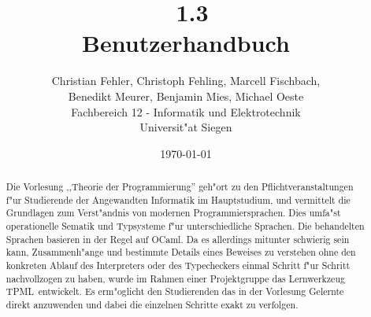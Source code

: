 \documentclass[a4paper,fleqn,latin1,twoside,12pt]{report}
\title{{\Huge \TPML\ 1.3}\\Benutzerhandbuch}
\author{{\Large Christian Fehler, Christoph Fehling, Marcell Fischbach,}\\{\Large Benedikt Meurer, Benjamin Mies, Michael Oeste}\\Fachbereich 12 - Informatik und Elektrotechnik\\Universit"at Siegen}
\date{\small\today}
\newcommand{\TPML}{\textsf{\textmd{TPML}}}
\begin{document}
\maketitle

\begin{abstract}
Die Vorlesung ,,Theorie der Programmierung'' geh"ort zu den Pflichtveranstaltungen f"ur Studierende der Angewandten
Informatik im Hauptstudium, und vermittelt die Grundlagen zum Verst"andnis von modernen Programmiersprachen. Dies
umfa"st operationelle Sematik und Typsysteme f"ur unterschiedliche Sprachen. Die behandelten Sprachen basieren
in der Regel auf OCaml. Da es allerdings mitunter schwierig sein kann, Zusammenh"ange und bestimmte Details eines
Beweises zu verstehen ohne den konkreten Ablauf des Interpreters oder des Typecheckers einmal Schritt f"ur Schritt
nachvollzogen zu haben, wurde im Rahmen einer Projektgruppe das Lernwerkzeug \TPML\ entwickelt. Es erm"oglicht den
Studierenden das in der Vorlesung Gelernte direkt anzuwenden und dabei die einzelnen Schritte exakt zu verfolgen.
\end{abstract}

\tableofcontents
\newpage









\begin{appendix}

\end{appendix}

\printindex
\end{document}

